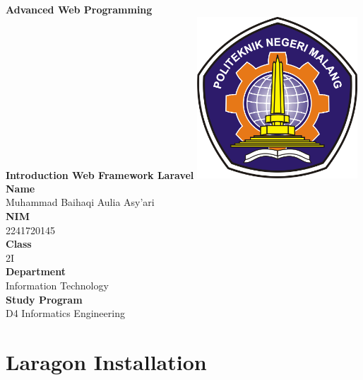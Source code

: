 \documentclass[12pt,titlepage]{article}
\newcommand{\vSubject}{Advanced Web Programming}
\newcommand{\vSubtitle}{Introduction Web Framework Laravel}
\newcommand{\vName}{Muhammad Baihaqi Aulia Asy'ari}
\newcommand{\vNIM}{2241720145}
\newcommand{\vClass}{2I}
\newcommand{\vDepartment}{Information Technology}
\newcommand{\vStudyProgram}{D4 Informatics Engineering}
\begin{document}
\begin{titlepage}
    \centering
    \vfill
    {\bfseries\LARGE
        \vSubject\\
        \vskip0.25cm
        \vSubtitle
    }
    \vfill
    \includegraphics[width=6cm]{images/polinema-logo.png}
    \vfill
    {
        \textbf{Name}\\
        \vName\\
        \vskip0.5cm
        \textbf{NIM}\\
        \vNIM\\
        \vskip0.5cm
        \textbf{Class}\\
        \vClass\\
        \vskip0.5cm
        \textbf{Department}\\
        \vDepartment\\
        \vskip0.5cm
        \textbf{Study Program}\\
        \vStudyProgram
    }
\end{titlepage}

\newpage

\section{Laragon Installation}
\end{document}
